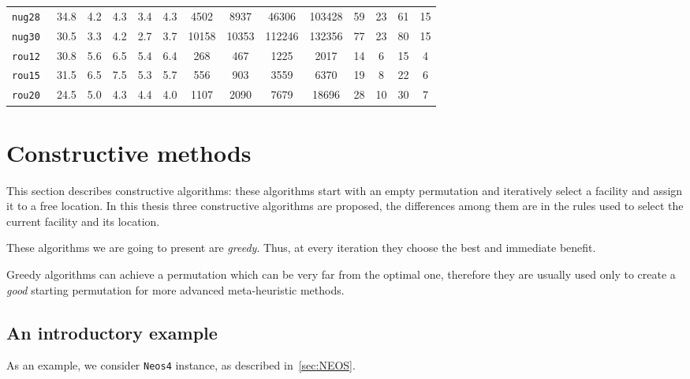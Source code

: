 \begin{landscape}
\begin{table}
\begin{tabular}{l
				S[table-format =2.1]
				*{4}{S[table-format =1.1]}
				*{2}{S[table-format =5.0]}
				*{2}{S[table-format =6.0]}
				*{4}{S[table-format =3.0]}}
\texttt{nug28           }&  34.8&  4.2 & 4.3 & 3.4 & 4.3 &  4502 &  8937 & 46306 &103428 &    59 &    23 &    61 &    15\\
\texttt{nug30           }&  30.5&  3.3 & 4.2 & 2.7 & 3.7 & 10158 & 10353 &112246 &132356 &    77 &    23 &    80 &    15\\
\texttt{rou12           }&  30.8&  5.6 & 6.5 & 5.4 & 6.4 &   268 &   467 &  1225 &  2017 &    14 &     6 &    15 &     4\\
\texttt{rou15           }&  31.5&  6.5 & 7.5 & 5.3 & 5.7 &   556 &   903 &  3559 &  6370 &    19 &     8 &    22 &     6\\
\texttt{rou20           }&  24.5&  5.0 & 4.3 & 4.4 & 4.0 &  1107 &  2090 &  7679 & 18696 &    28 &    10 &    30 &     7\\
			\bottomrule
		\end{tabular}

	\end{table}
\end{landscape}





\afterpage{}


\section{Constructive methods}
\label{sec:Constructive}

This section describes constructive algorithms: these algorithms start with an empty permutation and iteratively select a facility and assign it to a free location. In this thesis  three constructive algorithms are proposed, the differences among them are in the rules used to select the current facility and its location.

These algorithms we are going to present are \textit{greedy}. Thus, at every iteration they choose the best and immediate benefit. 

Greedy algorithms can achieve a permutation which can be very far from the optimal one, therefore they are usually used only to create a \textit{good} starting permutation for more advanced meta-heuristic methods.


\subsection{An introductory example}\label{sec:EsempioNeos4}
As an example, we consider \texttt{Neos4} instance, as described in~\ref{sec:NEOS}.
